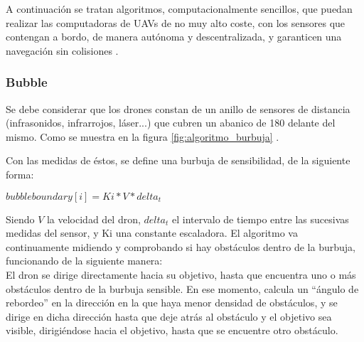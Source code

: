 A continuación se tratan algoritmos, computacionalmente sencillos, que puedan realizar las computadoras de UAVs de no muy alto coste, con los sensores que contengan a bordo, de manera autónoma y descentralizada, y garanticen una navegación sin colisiones \cite{the:algoritmos_evadir_obstaculos}.

\subsubsection{Bubble}
Se debe considerar que los drones constan de un anillo de sensores de distancia (infrasonidos, infrarrojos, láser...) que cubren un abanico de 180 delante del mismo. Como se muestra en la figura \ref{fig:algoritmo_burbuja} \cite{the:algoritmos_evadir_obstaculos}.\\


Con las medidas de éstos, se define una burbuja de sensibilidad, de la siguiente forma:\\
\begin{center}
	$bubble boundary[i]=Ki*V*delta_t$
\end{center}

Siendo $V$ la velocidad del dron, $delta_t$ el intervalo de tiempo entre las sucesivas medidas del sensor, y Ki una constante escaladora. El algoritmo va continuamente midiendo y comprobando si hay obstáculos dentro de la burbuja, funcionando de la siguiente manera:\\

El dron se dirige directamente hacia su objetivo, hasta que encuentra uno o más obstáculos dentro de la burbuja
sensible. En ese momento, calcula un “ángulo de rebordeo” en la dirección en la que haya menor densidad de
obstáculos, y se dirige en dicha dirección hasta que deje atrás al obstáculo y el objetivo sea visible, dirigiéndose
hacia el objetivo, hasta que se encuentre otro obstáculo.


